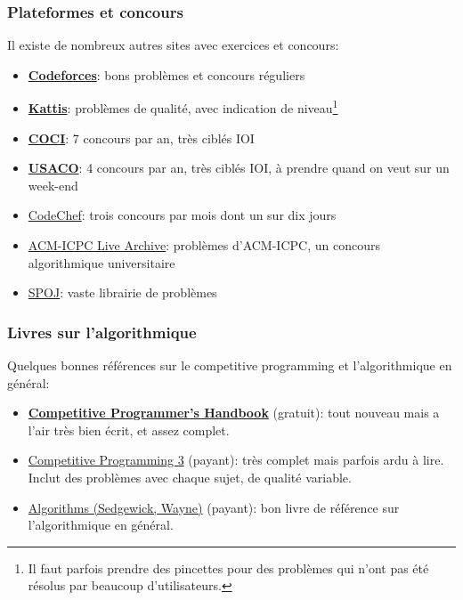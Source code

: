 \documentclass[12pt]{beamer}
\newcommand{\hrefb}[2]{{\color{linkblue}\href{#1}{#2}}}
\begin{document}
\begin{frame}
\frametitle{Plateformes et concours}
Il existe de nombreux autres sites avec exercices et concours:
\begin{itemize}
\item \textbf{\hrefb{http://codeforces.com/}{Codeforces}}: bons problèmes et concours réguliers
\item \textbf{\hrefb{https://open.kattis.com/}{Kattis}}: problèmes de qualité, avec indication de niveau\footnote{Il faut parfois prendre des pincettes pour des problèmes qui n'ont pas été résolus par beaucoup d'utilisateurs.}
\item \textbf{\hrefb{http://hsin.hr/coci/}{COCI}}: 7 concours par an, très ciblés IOI
\item \textbf{\hrefb{http://usaco.org}{USACO}}: 4 concours par an, très ciblés IOI, à prendre quand on veut sur un week-end
\item \hrefb{https://www.codechef.com/}{CodeChef}: trois concours par mois dont un sur dix jours
\item \hrefb{https://icpcarchive.ecs.baylor.edu/}{ACM-ICPC Live Archive}: problèmes d'ACM-ICPC, un concours algorithmique universitaire
\item \hrefb{http://www.spoj.com/}{SPOJ}: vaste librairie de problèmes
\end{itemize}
\end{frame}

\begin{frame}
\frametitle{Livres sur l'algorithmique}
Quelques bonnes références sur le competitive programming et l'algorithmique en général:
\begin{itemize}
\item \textbf{\hrefb{https://cses.fi/book.html}{Competitive Programmer's Handbook}} (gratuit): tout nouveau mais a l'air très bien écrit, et assez complet.
\item \hrefb{https://cpbook.net}{Competitive Programming 3} (payant): très complet mais parfois ardu à lire. Inclut des problèmes avec chaque sujet, de qualité variable.
\item \hrefb{http://algs4.cs.princeton.edu/home/}{Algorithms (Sedgewick, Wayne)} (payant): bon livre de référence sur l'algorithmique en général.
\end{itemize}
\end{frame}
\end{document}
